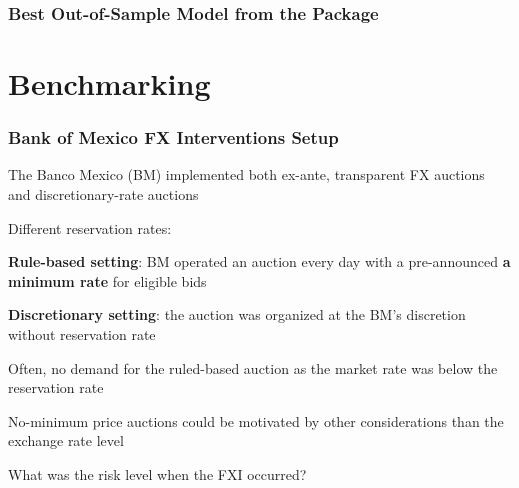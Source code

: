 \documentclass{beamer}
\newenvironment{wideitemize}{\itemize\addtolength{\itemsep}{10pt}}{\enditemize}
\begin{document}
\begin{frame}
  \frametitle{Best Out-of-Sample Model from the Package}
\end{frame}


\section{Benchmarking}

\begin{frame}
  \frametitle{Bank of Mexico FX Interventions Setup}  
  \begin{wideitemize}
    \item The Banco Mexico (BM) implemented both ex-ante, transparent FX
      auctions and discretionary-rate auctions
    \item Different reservation rates:
      \begin{wideitemize}
      \item \textbf{Rule-based setting}: BM operated an auction every day
        with a pre-announced \textbf{a minimum rate} for eligible bids
      \item \textbf{Discretionary setting}: the auction was organized at the BM's discretion without reservation rate
      \end{wideitemize}
  \item Often, no demand for the ruled-based auction as the market rate was
    below the reservation rate
  \item No-minimum price auctions could be motivated by other considerations
    than the exchange rate level
  \item What was the risk level when the FXI occurred?
  \end{wideitemize}
\end{frame}
\end{document}
